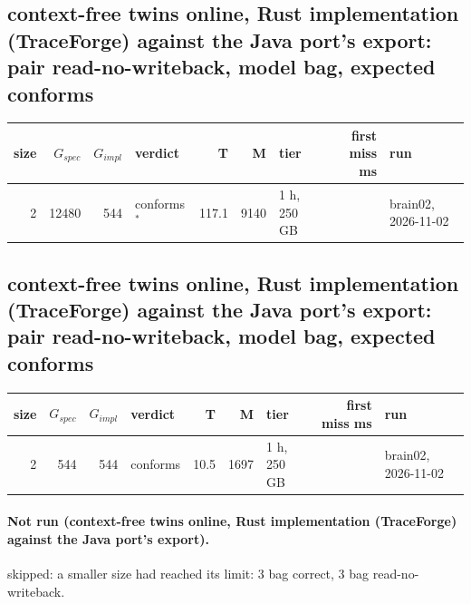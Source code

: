 \documentclass[10pt]{article}
\begin{document}
\subsection*{context-free twins online, Rust implementation (TraceForge) against the Java port's export: pair \textsf{read-no-writeback}, model bag, expected conforms}
\begin{longtable}{@{}rrrlrrlrl@{}}
\toprule
size & $G_{\mathit{spec}}$ & $G_{\mathit{impl}}$ & verdict & T & M & tier & first miss ms & run \\
\midrule
\endhead
\color{red} 2 & 12480 & 544 & conforms$^{\ast}$ & 117.1 & 9140 & 1 h, 250 GB &  & brain02, 2026-11-02 \\
\bottomrule
\end{longtable}
\subsection*{context-free twins online, Rust implementation (TraceForge) against the Java port's export: pair \textsf{read-no-writeback}, model bag, expected conforms}
\begin{longtable}{@{}rrrlrrlrl@{}}
\toprule
size & $G_{\mathit{spec}}$ & $G_{\mathit{impl}}$ & verdict & T & M & tier & first miss ms & run \\
\midrule
\endhead
\color{red} 2 & 544 & 544 & conforms & 10.5 & 1697 & 1 h, 250 GB &  & brain02, 2026-11-02 \\
\bottomrule
\end{longtable}
\paragraph{Not run (context-free twins online, Rust implementation (TraceForge) against the Java port's export).}
skipped: a smaller size had reached its limit: 3 bag correct, 3 bag read-no-writeback.\par
\end{document}
